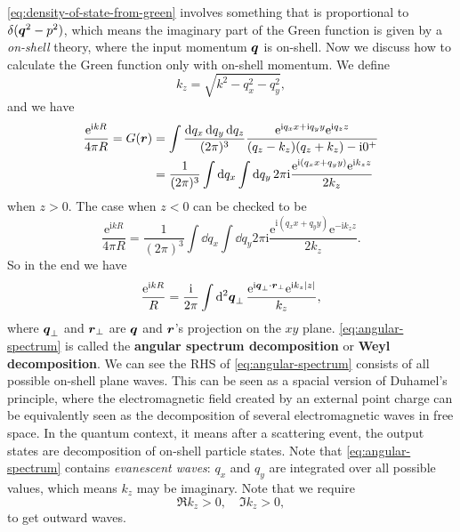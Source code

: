 \documentclass[hyperref, a4paper]{article}
\newcommand*{\ii}{\mathrm{i}}
\newcommand*{\ee}{\mathrm{e}}
\newcommand*{\concept}[1]{{\textbf{#1}}}
\begin{document}
\eqref{eq:density-of-state-from-green} involves something that is proportional to $\delta(\vb*{q}^2 - p^2)$,
which means the imaginary part of the Green function is given by a \emph{on-shell} theory, where the input 
momentum $\vb*{q}$ is on-shell. Now we discuss how to calculate the Green function only with on-shell momentum. 
We define 
\begin{equation}
    k_z = \sqrt{k^2 - q_x^2 - q_y^2},
    \label{eq:kz-on-shell}
\end{equation}
and we have 
\[
    \begin{aligned}
        \frac{\ee^{\ii k R}}{4 \pi R} = G(\vb*{r}) &= 
        \int \frac{\dd{q_x} \dd{q_y} \dd{q_z}}{(2\pi)^3} \frac{\ee^{\ii q_x x + \ii q_y y} \ee^{\ii q_z z}}{(q_z - k_z) (q_z + k_z) - \ii 0^+} \\
        &= \frac{1}{(2\pi)^3} \int \dd{q_x} \int \dd{q_y} 2 \pi \ii \frac{\ee^{\ii (q_x x + q_y y)} \ee^{\ii k_z z}}{2 k_z}
    \end{aligned}
\]
when $z > 0$. The case when $z < 0$ can be checked to be 
\[
    \frac{\ee^{\ii k R}}{4 \pi R} = \frac{1}{(2\pi)^3} \int \dd{q_x} \int \dd{q_y} 2 \pi \ii \frac{\ee^{\ii (q_x x + q_y y)} \ee^{- \ii k_z z}}{2 k_z}.
\]
So in the end we have 
\begin{equation}
    \frac{\ee^{\ii k R}}{R} = \frac{\ii}{2\pi} \int \dd[2]{\vb*{q}_\bot} \frac{\ee^{\ii \vb*{q}_\bot \cdot \vb*{r}_\bot} \ee^{\ii k_z \abs*{z}}}{k_z},
    \label{eq:angular-spectrum}
\end{equation}
where $\vb*{q}_\bot$ and $\vb*{r}_\bot$ are $\vb*{q}$ and $\vb*{r}$'s projection on the $xy$ plane.
\eqref{eq:angular-spectrum} is called the \concept{angular spectrum decomposition} or \concept{Weyl decomposition}.
We can see the RHS of \eqref{eq:angular-spectrum} consists of all possible on-shell plane waves. 
This can be seen as a spacial version of Duhamel's principle, where the electromagnetic field created by an 
external point charge can be equivalently seen as the decomposition of several electromagnetic waves in free space.
In the quantum context, it means after a scattering event, the output states are decomposition of on-shell 
particle states. Note that \eqref{eq:angular-spectrum} contains \emph{evanescent waves}: $q_x$ and $q_y$ 
are integrated over all possible values, which means $k_z$ may be imaginary. Note that we require 
\begin{equation}
    \Re k_z > 0, \quad \Im k_z > 0,
\end{equation}
to get outward waves. 
\end{document}

